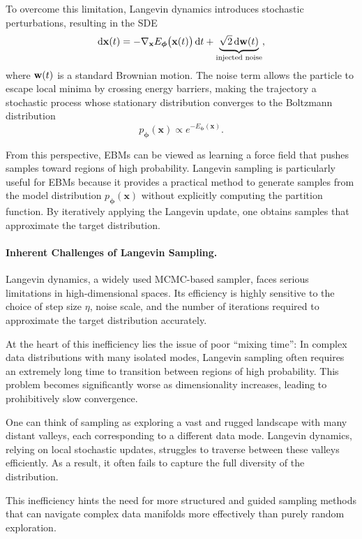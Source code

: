 To overcome this limitation, Langevin dynamics introduces stochastic perturbations, resulting in the SDE
\[
\mathop{}\!\mathrm{d} \mathbf{x}(t) = -\nabla_{\mathbf{x}} E_{\bm{\phi}}\big(\mathbf{x}(t)\big)  \mathop{}\!\mathrm{d} t + \underbrace{\sqrt{2 } \mathop{}\!\mathrm{d} {\mathbf{w}}(t)}_{\text{injected noise}},
\]
where ${\mathbf{w}}(t)$ is a standard Brownian motion. 
The noise term allows the particle to escape local minima by crossing energy barriers, making the trajectory a stochastic process whose stationary distribution converges to the Boltzmann distribution
\[
p_{\bm{\phi}}(\mathbf{x}) \propto e^{-E_{\bm{\phi}}(\mathbf{x})}.
\]

From this perspective, EBMs can be viewed as learning a force field that pushes samples toward regions of high probability. Langevin sampling is particularly useful for EBMs because it provides a practical method to generate samples from the model distribution $p_{\bm{\phi}}(\mathbf{x})$ without explicitly computing the partition function. By iteratively applying the Langevin update, one obtains samples that approximate the target distribution.


\paragraph{Inherent Challenges of Langevin Sampling.}
Langevin dynamics, a widely used MCMC-based sampler, faces serious limitations in high-dimensional spaces. Its efficiency is highly sensitive to the choice of step size $\eta$, noise scale, and the number of iterations required to approximate the target distribution accurately. 

At the heart of this inefficiency lies the issue of poor ``mixing time'': In complex data distributions with many isolated modes, Langevin sampling often requires an extremely long time to transition between regions of high probability. This problem becomes significantly worse as dimensionality increases, leading to prohibitively slow convergence.

One can think of sampling as exploring a vast and rugged landscape with many distant valleys, each corresponding to a different data mode. Langevin dynamics, relying on local stochastic updates, struggles to traverse between these valleys efficiently. As a result, it often fails to capture the full diversity of the distribution.

This inefficiency hints the need for more structured and guided sampling methods that can navigate complex data manifolds more effectively than purely random exploration.



